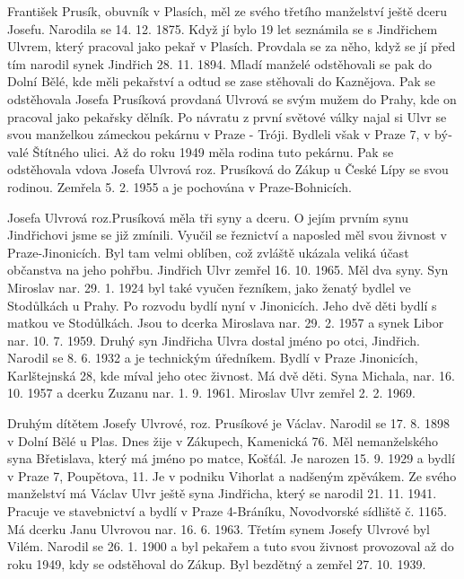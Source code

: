 \documentclass[../dejiny-rodu-prusiku.tex]{subfiles}
\begin{document}
František Prusík, obuvník v Plasích, měl ze svého třetího manželství ještě dceru Josefu. Narodila se 14. 12. 1875. Když jí bylo 19 let seznámila se s Jindřichem Ulvrem, který pracoval jako pekař v Plasích. Provda­la se za něho, když se jí před tím narodil synek Jindřich 28. 11. 1894. Mladí manželé odstěhovali se pak do Dolní Bělé, kde měli pekařství a odtud se zase stěhovali do Kaznějova. Pak se odstěhovala Josefa Prusíková provdaná Ulvrová se svým mužem do Prahy, kde on pracoval jako pekařsky dělník. Po návratu z první svě­tové války najal si Ulvr se svou manželkou zámeckou pekárnu v Praze - Tróji. Bydleli však v Praze 7, v bý­valé Štítného ulici. Až do roku 1949 měla rodina tuto pekárnu. Pak se odstěhovala vdova Josefa Ulvrová roz. Prusíková do Zákup u České Lípy se svou rodinou. Zemřela 5. 2. 1955 a je pochována v Praze-Bohnicích.

Josefa Ulvrová roz.Prusíková měla tři syny a dceru. O jejím prvním synu Jindřichovi jsme se již zmínili. Vyučil se řeznictví a naposled měl svou živnost v Praze-Jinonicích. Byl tam velmi oblíben, což zvláště ukázala veliká účast občanstva na jeho pohřbu. Jindřich Ulvr zemřel 16. 10. 1965.  Měl dva syny. Syn Miroslav nar. 29. 1. 1924 byl také vyučen řezníkem, jako ženatý bydlel ve Stodůlkách u Prahy. Po rozvodu bydlí nyní v Jinonicích. Jeho dvě děti bydlí s matkou ve Stodůlkách. Jsou to dcerka Miroslava nar. 29. 2. 1957 a synek Libor nar. 10. 7. 1959. Druhý syn Jindřicha Ulvra dostal jméno po otci, Jindřich. Narodil se 8. 6. 1932 a je technickým úředníkem. Bydlí v Praze Jinonicích, Karlštejnská 28, kde míval jeho otec živnost. Má dvě děti. Syna Michala, nar. 16. 10. 1957 a dcerku Zuzanu nar. 1. 9. 1961. Miroslav Ulvr zemřel 2. 2. 1969.

Druhým dítětem Josefy Ulvrové, roz. Prusíkové je Václav. Narodil se 17. 8. 1898 v Dolní Bělé u Plas. Dnes žije v Zákupech, Kamenická 76. Měl nemanželského syna Břetislava, který má jméno po matce, Košťál. Je narozen 15. 9. 1929 a bydlí v Praze 7,  Poupětova, 11. Je v podniku Vihorlat a nadšeným zpěvákem. Ze svého manželství má Václav Ulvr ještě syna Jindřicha, který se narodil 21. 11. 1941. Pracuje ve staveb­nictví a bydlí v Praze 4-Bráníku, Novodvorské sídliště č. 1165. Má dcerku Janu Ulvrovou nar. 16. 6. 1963. Třetím synem Josefy Ulvrové byl Vilém. Narodil se 26. 1. 1900 a byl pekařem a tuto svou živnost provozoval až do roku 1949, kdy se odstěhoval do Zákup. Byl bezdět­ný a zemřel 27. 10. 1939.
\end{document}
